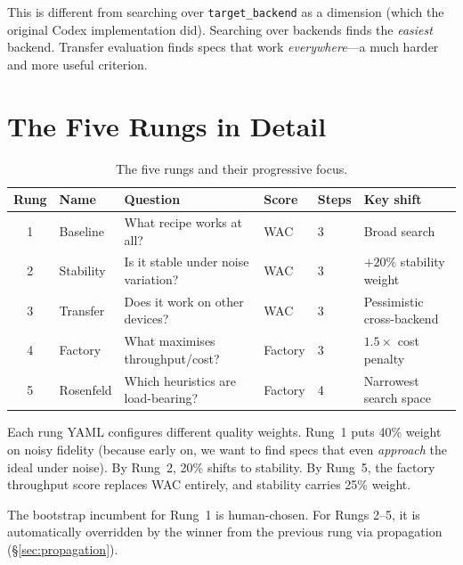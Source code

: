 \documentclass[11pt,a4paper]{article}
\newcommand{\code}[1]{\texttt{#1}}
\begin{document}
\begin{warning}
This is different from searching over \code{target\_backend} as a dimension
(which the original Codex implementation did). Searching over backends finds
the \emph{easiest} backend. Transfer evaluation finds specs that work
\emph{everywhere}---a much harder and more useful criterion.
\end{warning}

\section{The Five Rungs in Detail}
\label{sec:rungs}

\begin{table}[H]
\centering
\small
\begin{tabular}{@{}clp{4.8cm}lll@{}}
\toprule
\textbf{Rung} & \textbf{Name} & \textbf{Question} & \textbf{Score} & \textbf{Steps} & \textbf{Key shift} \\
\midrule
1 & Baseline          & What recipe works at all?           & WAC  & 3 & Broad search \\
2 & Stability         & Is it stable under noise variation? & WAC  & 3 & $+20\%$ stability weight \\
3 & Transfer          & Does it work on other devices?      & WAC  & 3 & Pessimistic cross-backend \\
4 & Factory           & What maximises throughput/cost?      & Factory & 3 & $1.5\times$ cost penalty \\
5 & Rosenfeld         & Which heuristics are load-bearing?  & Factory & 4 & Narrowest search space \\
\bottomrule
\end{tabular}
\caption{The five rungs and their progressive focus.}
\label{tab:rungs}
\end{table}

Each rung YAML configures different quality weights.
Rung~1 puts 40\% weight on noisy fidelity (because early on, we want to find
specs that even \emph{approach} the ideal under noise). By Rung~2, 20\% shifts
to stability. By Rung~5, the factory throughput score replaces WAC entirely,
and stability carries 25\% weight.

The bootstrap incumbent for Rung~1 is human-chosen. For Rungs 2--5, it is
automatically overridden by the winner from the previous rung via propagation
(\S\ref{sec:propagation}).
\end{document}
